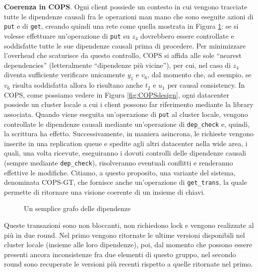 \documentclass[twoside]{article}
\begin{document}
\begin{multicols}{2}
\textbf{Coerenza in COPS}.
Ogni client possiede un contesto in cui vengono tracciate tutte le dipendenze causali fra le operazioni man mano che sono eseguite azioni di \texttt{put} e di \texttt{get}, creando quindi una rete come quella mostrata in Figura \ref{fig:dipendenze}: se si volesse effettuare un'operazione di \texttt{put} su $z_4$ dovrebbero essere controllate e soddisfatte tutte le sue dipendenze causali prima di procedere. Per minimizzare l'overhead che scaturisce da questo controllo, COPS si affida alle sole ``nearest dependencies'' (letteralmente ``dipendenze più vicine''), per cui, nel caso di $z_4$ diventa sufficiente verificare unicamente $y_1$ e $v_6$, dal momento che, ad esempio, se $v_6$ risulta soddisfatta allora lo risultano anche $t_2$ e $u_1$ per causal consistency.
In COPS, come possiamo vedere in Figura \ref{fig:COPSdesign}, ogni datacenter possiede un cluster locale a cui i client possono far riferimento mediante la library associata.
Quando viene eseguita un'operazione di \texttt{put} al cluster locale, vengono controllate le dipendenze causali mediante un'operazione di \texttt{dep\_check} e, quindi, la scrittura ha effetto. Successivamente, in maniera asincrona, le richieste vengono inserite in una replication queue e spedite agli altri datacenter nella wide area, i quali, una volta ricevute, eseguiranno i dovuti controlli delle dipendenze causali (sempre mediante \texttt{dep\_check}), risolveranno eventuali conflitti e renderanno effettive le modifiche.
Citiamo, a questo proposito, una variante del sistema, denominata COPS-GT, che fornisce anche un'operazione di \texttt{get\_trans}, la quale permette di ritornare una visione coerente di un insieme di chiavi.
\begin{figure}[H]
\centering
{}
\caption{Un semplice grafo delle dipendenze}
\label{fig:dipendenze}
\end{figure}
Queste transazioni sono non bloccanti, non richiedono lock e vengono realizzate al più in due round. 
Nel primo vengono ritornate le ultime versioni disponibili nel cluster locale (insieme alle loro dipendenze), poi, dal momento che possono essere presenti ancora inconsistenze fra due elementi di questo gruppo, nel secondo round sono recuperate le versioni più recenti rispetto a quelle ritornate nel primo.

\end{multicols}
\end{document}
